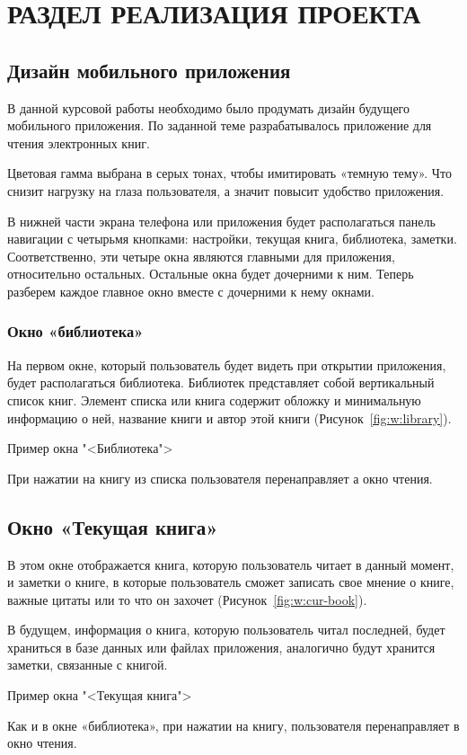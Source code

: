 \chapter{РАЗДЕЛ РЕАЛИЗАЦИЯ ПРОЕКТА}

\section{Дизайн мобильного приложения}
В данной курсовой работы необходимо было продумать дизайн
будущего мобильного приложения. По заданной теме разрабатывалось
приложение для чтения электронных книг.\par
Цветовая гамма выбрана в серых тонах, чтобы имитировать «темную
тему». Что снизит нагрузку на глаза пользователя, а значит повысит удобство
приложения.\par
В нижней части экрана телефона или приложения будет располагаться
панель навигации с четырьмя кнопками: настройки, текущая книга,
библиотека, заметки. Соответственно, эти четыре окна являются главными
для приложения, относительно остальных. Остальные окна будет дочерними
к ним. Теперь разберем каждое главное окно вместе с дочерними к нему
окнами.

\subsection{Окно «библиотека»}
На первом окне, который пользователь будет видеть при открытии
приложения, будет располагаться библиотека. Библиотек представляет собой
вертикальный список книг. Элемент списка или книга содержит обложку и
минимальную информацию о ней, название книги и автор этой книги
(Рисунок~\ref{fig:w:library}).

\begin{image}
	\caption{Пример окна "<Библиотека">}
	\label{fig:w:library}
\end{image}

При нажатии на книгу из списка пользователя перенаправляет а окно
чтения.\par

\section{Окно «Текущая книга»}
В этом окне отображается книга, которую пользователь читает в
данный момент, и заметки о книге, в которые пользователь сможет записать
свое мнение о книге, важные цитаты или то что он захочет
(Рисунок~\ref{fig:w:cur-book}).\par
В будущем, информация о книга, которую пользователь читал
последней, будет храниться в базе данных или файлах приложения,
аналогично будут хранится заметки, связанные с книгой.

\begin{image}
	\caption{Пример окна "<Текущая книга">}
	\label{fig:w:cur-book}
\end{image}

Как и в окне «библиотека», при нажатии на книгу, пользователя
перенаправляет в окно чтения.

\section{}

